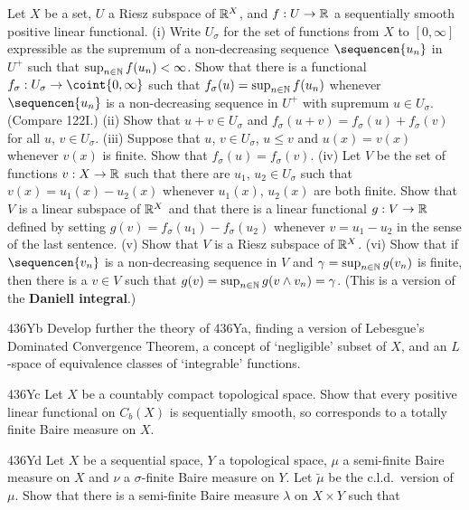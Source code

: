 {      
Let $X$ be a set, $U$ a Riesz subspace of $\Bbb R^X$, and $f:U\to\Bbb R$ 
a sequentially smooth positive linear functional.   (i) Write 
$U_{\sigma}$ for the set of functions from $X$ to $[0,\infty]$ 
expressible as the 
supremum of a non-decreasing sequence $\sequencen{u_n}$ in $U^+$ such 
that $\sup_{n\in\Bbb N}f(u_n)<\infty$.   Show that there is a functional 
$f_{\sigma}:U_{\sigma}\to\coint{0,\infty}$ such that 
$f_{\sigma}(u)=\sup_{n\in\Bbb N}f(u_n)$ whenever $\sequencen{u_n}$ is a 
non-decreasing sequence in $U^+$ with supremum $u\in U_{\sigma}$. 
(Compare 122I.)   (ii) Show that $u+v\in U_{\sigma}$ and 
$f_{\sigma}(u+v)=f_{\sigma}(u)+f_{\sigma}(v)$ for all $u$, $v\in 
U_{\sigma}$.   (iii) Suppose that $u$, $v\in U_{\sigma}$, $u\le v$ and 
$u(x)=v(x)$ whenever $v(x)$ is finite.   Show that 
$f_{\sigma}(u)=f_{\sigma}(v)$.    
(iv) Let $V$ be the set of functions $v:X\to\Bbb R$ such that there are 
$u_1$, $u_2\in U_{\sigma}$ such that $v(x)=u_1(x)-u_2(x)$ whenever 
$u_1(x)$, $u_2(x)$ are both finite.   Show that $V$ is a linear subspace 
of $\Bbb R^X$ and that there is a linear functional $g:V\to\Bbb R$ 
defined by setting $g(v)=f_{\sigma}(u_1)-f_{\sigma}(u_2)$ whenever 
$v=u_1-u_2$ in the sense of the last sentence.   (v) Show that $V$ is a 
Riesz subspace of $\Bbb R^X$.   (vi) Show that if $\sequencen{v_n}$ is a 
non-decreasing sequence in $V$ and $\gamma=\sup_{n\in\Bbb N}g(v_n)$ is 
finite, then there is a $v\in V$ such that $g(v)=\sup_{n\in\Bbb 
N}g(v\wedge v_n)=\gamma$.   (This is a version of 
the {\bf Daniell integral}.) 
      
\spheader 436Yb Develop further the theory of 436Ya, finding a version 
of Lebesgue's Dominated Convergence Theorem, a concept of `negligible' 
subset of $X$, and an $L$-space of equivalence classes of `integrable' 
functions. 
      
\spheader 436Yc Let $X$ be a countably compact topological space. 
Show that every positive linear functional on $C_b(X)$ is sequentially 
smooth, so corresponds to a totally finite Baire measure on $X$. 
      
\spheader 436Yd Let $X$ be a sequential space, $Y$ a topological space, 
$\mu$ a semi-finite Baire measure on $X$ and $\nu$ a $\sigma$-finite 
Baire measure on $Y$.   Let $\tilde\mu$ be the c.l.d.\ version of $\mu$. 
Show that there is a semi-finite Baire measure $\lambda$ on $X\times Y$ 
such that 
      
}
